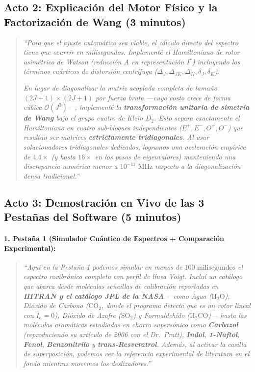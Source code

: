 \documentclass[11pt,letterpaper]{article}
\begin{document}
\subsection{Acto 2: Explicación del Motor Físico y la Factorización de Wang (3 minutos)}
\begin{quote}
\textit{``Para que el ajuste automático sea viable, el cálculo directo del espectro tiene que ocurrir en milisegundos. Implementé el Hamiltoniano de rotor asimétrico de Watson (reducción $A$ en representación $I^r$) incluyendo los términos cuárticos de distorsión centrífuga ($\Delta_J, \Delta_{JK}, \Delta_K, \delta_J, \delta_K$).}

\textit{En lugar de diagonalizar la matriz acoplada completa de tamaño $(2J+1)\times(2J+1)$ por fuerza bruta ---cuyo costo crece de forma cúbica $\mathcal{O}(J^3)$---, implementé la \textbf{transformación unitaria de simetría de Wang} bajo el grupo cuatro de Klein $D_2$. Esto separa exactamente el Hamiltoniano en cuatro sub-bloques independientes ($E^+, E^-, O^+, O^-$) que resultan ser matrices \textbf{estrictamente tridiagonales}. Al usar solucionadores tridiagonales dedicados, logramos una aceleración empírica de $4.4\times$ (y hasta $16\times$ en los pasos de eigenvalores) manteniendo una discrepancia numérica menor a $10^{-11}\text{ MHz}$ respecto a la diagonalización densa tradicional.''}
\end{quote}

\subsection{Acto 3: Demostración en Vivo de las 3 Pestañas del Software (5 minutos)}

\paragraph{1. Pestaña 1 (Simulador Cuántico de Espectros + Comparación Experimental):}
\begin{quote}
\textit{``Aquí en la Pestaña 1 podemos simular en menos de $100\text{ milisegundos}$ el espectro rovibrónico completo con perfil de línea Voigt. Incluí un catálogo que abarca desde moléculas sencillas de calibración reportadas en \textbf{HITRAN y el catálogo JPL de la NASA} ---como Agua ($\text{H}_2\text{O}$), Dióxido de Carbono ($\text{CO}_2$, donde el programa detecta que es un rotor lineal con $I_a=0$), Dióxido de Azufre ($\text{SO}_2$) y Formaldehído ($\text{H}_2\text{CO}$)--- hasta las moléculas aromáticas estudiadas en chorro supersónico como \textbf{Carbazol} (reproduciendo su artículo de 2006 con el Dr.\ Pratt), \textbf{Indol}, \textbf{1-Naftol}, \textbf{Fenol}, \textbf{Benzonitrilo} y \textbf{trans-Resveratrol}. Además, al activar la casilla de superposición, podemos ver la referencia experimental de literatura en el fondo mientras movemos los deslizadores.''}
\end{quote}
\end{document}
